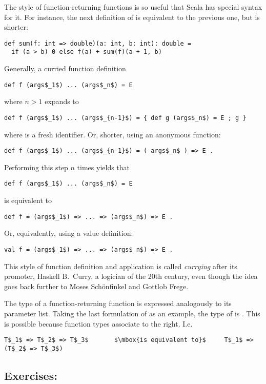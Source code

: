 \documentclass[a4paper,12pt,twoside,titlepage]{book}
\begin{document}
The style of function-returning functions is so useful that Scala has
special syntax for it. For instance, the next definition of 
is equivalent to the previous one, but is shorter:
\begin{lstlisting}
def sum(f: int => double)(a: int, b: int): double =
  if (a > b) 0 else f(a) + sum(f)(a + 1, b)
\end{lstlisting}
Generally, a curried function definition 
\begin{lstlisting}
def f (args$_1$) ... (args$_n$) = E
\end{lstlisting}
where $n > 1$ expands to
\begin{lstlisting}
def f (args$_1$) ... (args$_{n-1}$) = { def g (args$_n$) = E ; g }
\end{lstlisting}
where  is a fresh identifier. Or, shorter, using an anonymous function:
\begin{lstlisting}
def f (args$_1$) ... (args$_{n-1}$) = ( args$_n$ ) => E .
\end{lstlisting}
Performing this step $n$ times yields that
\begin{lstlisting}
def f (args$_1$) ... (args$_n$) = E
\end{lstlisting}
is equivalent to
\begin{lstlisting}
def f = (args$_1$) => ... => (args$_n$) => E .
\end{lstlisting}
Or, equivalently, using a value definition:
\begin{lstlisting}
val f = (args$_1$) => ... => (args$_n$) => E .
\end{lstlisting}
This style of function definition and application is called {\em
currying} after its promoter, Haskell B.\ Curry, a logician of the
20th century, even though the idea goes back further to Moses
Sch\"onfinkel and Gottlob Frege.

The type of a function-returning function is expressed analogously to
its parameter list. Taking the last formulation of  as an example,
the type of  is .
This is possible because function types associate to the right. I.e.
\begin{lstlisting}
T$_1$ => T$_2$ => T$_3$       $\mbox{is equivalent to}$     T$_1$ => (T$_2$ => T$_3$)
\end{lstlisting}

\subsection*{Exercises:}
\end{document}

